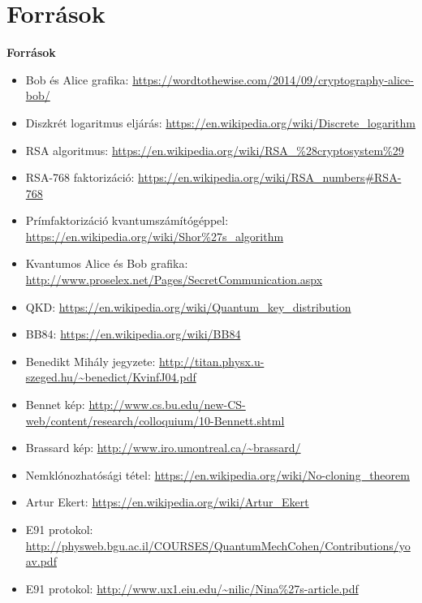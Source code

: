 \documentclass{beamer}
\begin{document}
    \section{Források}

    \begin{frame}

        \center

        \textbf{Források}

        \tiny

        \begin{itemize}
            \item Bob és Alice grafika: \url{https://wordtothewise.com/2014/09/cryptography-alice-bob/}
            \item Diszkrét logaritmus eljárás: \url{https://en.wikipedia.org/wiki/Discrete_logarithm}
            \item RSA algoritmus: \url{https://en.wikipedia.org/wiki/RSA_\%28cryptosystem\%29}
            \item RSA-768 faktorizáció: \url{https://en.wikipedia.org/wiki/RSA_numbers\#RSA-768}
            \item Prímfaktorizáció kvantumszámítógéppel: \url{https://en.wikipedia.org/wiki/Shor\%27s_algorithm}
            \item Kvantumos Alice és Bob grafika: \url{http://www.proselex.net/Pages/SecretCommunication.aspx}
            \item QKD: \url{https://en.wikipedia.org/wiki/Quantum_key_distribution}
            \item BB84: \url{https://en.wikipedia.org/wiki/BB84}
            \item Benedikt Mihály jegyzete: \url{http://titan.physx.u-szeged.hu/~benedict/KvinfJ04.pdf}
            \item Bennet kép: \url{http://www.cs.bu.edu/new-CS-web/content/research/colloquium/10-Bennett.shtml}
            \item Brassard kép: \url{http://www.iro.umontreal.ca/~brassard/}
            \item Nemklónozhatósági tétel: \url{https://en.wikipedia.org/wiki/No-cloning_theorem}
            \item Artur Ekert: \url{https://en.wikipedia.org/wiki/Artur_Ekert}
            \item E91 protokol: \url{http://physweb.bgu.ac.il/COURSES/QuantumMechCohen/Contributions/yoav.pdf}
            \item E91 protokol: \url{http://www.ux1.eiu.edu/~nilic/Nina\%27s-article.pdf}
        \end{itemize}

    \end{frame}
\end{document}
